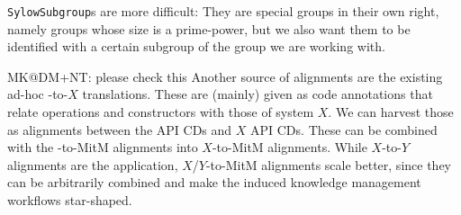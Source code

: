 \texttt{SylowSubgroup}s are more difficult: They are special groups in their
own right, namely groups whose size is a prime-power, but we also want them
to be identified with a certain subgroup of the group we are working
with.

\begin{newpart}{MK@DM+NT: please check this }
  Another source of alignments are the existing ad-hoc \Sage-to-$X$ translations. These
  are (mainly) given as \Sage code annotations that relate \Sage operations and
  constructors with those of system $X$. We can harvest those as alignments between
  the \Sage API CDs and $X$ API CDs. These can be combined with the \Sage-to-MitM
  alignments into $X$-to-MitM alignments. While $X$-to-$Y$ alignments are the application,
  $X$/$Y$-to-MitM alignments scale better, since they can be arbitrarily combined and make
  the induced knowledge management workflows star-shaped.
\end{newpart}


